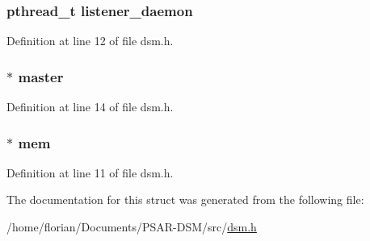 \subsubsection[{\texorpdfstring{listener\+\_\+daemon}{listener_daemon}}]{\setlength{\rightskip}{0pt plus 5cm}pthread\+\_\+t listener\+\_\+daemon}\hypertarget{structdsm__s_a4977415cf5a2a53116bbc29834d4f216}{}\label{structdsm__s_a4977415cf5a2a53116bbc29834d4f216}


Definition at line 12 of file dsm.\+h.

\subsubsection[{\texorpdfstring{master}{master}}]{$\ast$ master}\hypertarget{structdsm__s_a3de7fd7c308a2411b942e0236fd5bb83}{}\label{structdsm__s_a3de7fd7c308a2411b942e0236fd5bb83}


Definition at line 14 of file dsm.\+h.

\subsubsection[{\texorpdfstring{mem}{mem}}]{$\ast$ mem}\hypertarget{structdsm__s_aae25464acfd352563246c0194a8f590e}{}\label{structdsm__s_aae25464acfd352563246c0194a8f590e}


Definition at line 11 of file dsm.\+h.



The documentation for this struct was generated from the following file\+:\begin{DoxyCompactItemize}
\item 
/home/florian/\+Documents/\+P\+S\+A\+R-\/\+D\+S\+M/src/\hyperlink{dsm_8h}{dsm.\+h}\end{DoxyCompactItemize}
